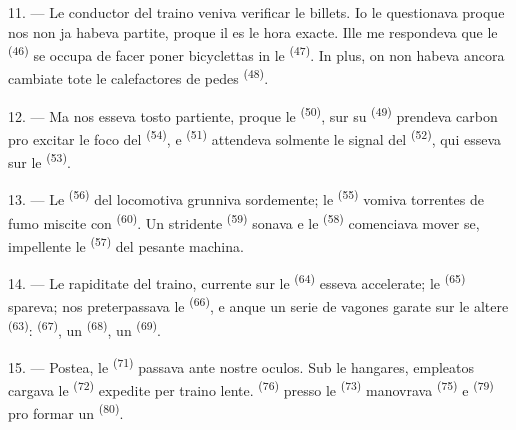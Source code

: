 11. --- Le conductor del traino veniva verificar le billets. Io le questionava
proque nos non ja habeva partite, proque il es le hora exacte. Ille me
respondeva que le  \textsuperscript{(46)} se occupa de
facer poner bicyclettas in le  \textsuperscript{(47)}. In plus,
on non habeva ancora cambiate tote le calefactores de pedes
\textsuperscript{(48)}.

12. --- Ma nos esseva tosto partiente, proque le 
\textsuperscript{(50)}, sur su  \textsuperscript{(49)} prendeva
carbon pro excitar le foco del  \textsuperscript{(54)}, e
 \textsuperscript{(51)} attendeva solmente le signal del
 \textsuperscript{(52)}, qui esseva sur le
 \textsuperscript{(53)}.

13. --- Le  \textsuperscript{(56)} del locomotiva grunniva
sordemente; le  \textsuperscript{(55)} vomiva torrentes de fumo
miscite con  \textsuperscript{(60)}. Un stridente 
\textsuperscript{(59)} sonava e le  \textsuperscript{(58)}
comenciava mover se, impellente le  \textsuperscript{(57)} del
pesante machina.

\VUsaut{3.0mm}
\VUsaut{3.0mm}

14. --- Le rapiditate del traino, currente sur le 
\textsuperscript{(64)} esseva accelerate; le 
\textsuperscript{(65)} spareva; nos preterpassava le 
\textsuperscript{(66)}, e anque un serie de vagones garate sur le altere
 \textsuperscript{(63)}: 
\textsuperscript{(67)}, un  \textsuperscript{(68)}, un
 \textsuperscript{(69)}.


15. --- Postea, le  \textsuperscript{(71)} passava
ante nostre oculos. Sub le hangares, empleatos cargava le 
\textsuperscript{(72)} expedite per traino lente. 
\textsuperscript{(76)} presso le 
\textsuperscript{(73)} manovrava 
\textsuperscript{(75)} e  \textsuperscript{(79)}
pro formar un  \textsuperscript{(80)}.

